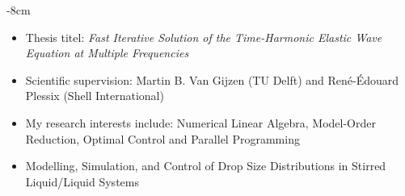 \documentclass[10pt,a4paper]{altacv}
\begin{document}

\begin{adjustwidth}{}{-8cm}
\makecvheader
\end{adjustwidth}


\begin{itemize}
\item Thesis titel: \textit{Fast Iterative Solution of the Time-Harmonic Elastic Wave Equation at Multiple Frequencies}
\item Scientific supervision: Martin B. Van Gijzen (TU Delft) and Ren\'e-\'Edouard  Plessix (Shell International)
\item My research interests include: Numerical Linear Algebra, Model-Order Reduction, Optimal Control and Parallel Programming
\end{itemize}

\divider

\begin{itemize}
\item Modelling, Simulation, and Control of Drop Size Distributions in Stirred Liquid/Liquid Systems
\end{itemize}
\end{document}

